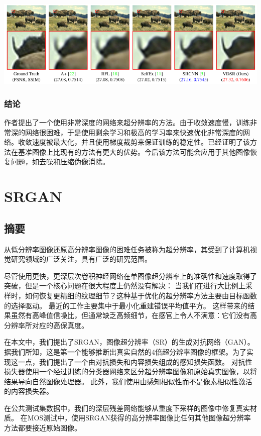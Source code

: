 \documentclass[UTF8,a4paper,10pt]{ctexrep}
\begin{document}
\includegraphics[width=\textwidth]{figure/7.png}

\subsection{结论}
作者提出了一个使用非常深度的网络来超分辨率的方法。由于收敛速度慢，训练非常深的网络很困难，于是使用剩余学习和极高的学习率来快速优化非常深度的网络。收敛速度被最大化，并且使用梯度裁剪来保证训练的稳定性。已经证明了该方法在基准图像上比现有的方法有更大的优势。今后该方法可能会应用于其他图像恢复问题，如去噪和压缩伪像消除。


\chapter{SRGAN}
\section{摘要}
从低分辨率图像还原高分辨率图像的困难任务被称为超分辨率，其受到了计算机视觉研究领域的广泛关注，具有广泛的研究范围。

尽管使用更快，更深层次卷积神经网络在单图像超分辨率上的准确性和速度取得了突破，但是一个核心问题在很大程度上仍然没有解决：
当我们在进行大比例上采样时，如何恢复更精细的纹理细节？这种基于优化的超分辨率方法主要由目标函数的选择驱动。
最近的工作主要集中于最小化重建错误平均值平方。
这样带来的结果虽然有高峰值信噪比，但通常缺乏高频细节，在感官上令人不满意：它们没有高分辨率所对应的高保真度。

在本文中，我们提出了SRGAN，图像超分辨率（SR）的生成对抗网络（GAN）。
据我们所知，这是第一个能够推断出真实自然的4倍超分辨率图像的框架。为了实现这一点，我们提出了一个由对抗损失和内容损失组成的感知损失函数。
对抗性损失器使用一个经过训练的分类器网络来区分超分辨率图像和原始真实图像，以将结果导向自然图像处理器。
此外，我们使用由感知相似性而不是像素相似性激活的内容损失器。

在公共测试集数据中，我们的深层残差网络能够从重度下采样的图像中修复真实材质。
在MOS测试中，使用SRGAN获得的高分辨率图像比任何其他图像超分辨率方法都要接近原始图像。
\end{document}
